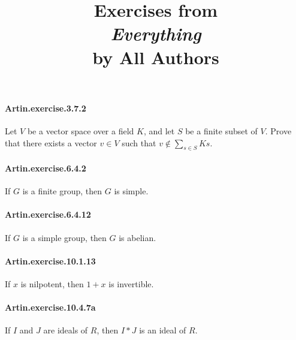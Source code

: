 \documentclass{article}
\title{\textbf{
Exercises from \\
\textit{Everything} \\
by All Authors
}}
\date{}
\begin{document}
\maketitle




\paragraph{Artin.exercise.3.7.2} Let $V$ be a vector space over a field $K$, and let $S$ be a finite subset of $V$. Prove that there exists a vector $v \in V$ such that $v \notin \sum_{s \in S} K s$.

\paragraph{Artin.exercise.6.4.2} If $G$ is a finite group, then $G$ is simple.

\paragraph{Artin.exercise.6.4.12} If $G$ is a simple group, then $G$ is abelian.

\paragraph{Artin.exercise.10.1.13} If $x$ is nilpotent, then $1 + x$ is invertible.

\paragraph{Artin.exercise.10.4.7a} If $I$ and $J$ are ideals of $R$, then $I * J$ is an ideal of $R$.
\end{document}
